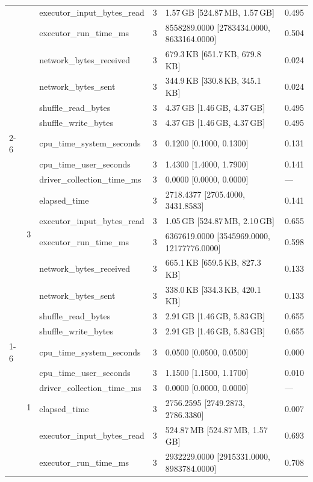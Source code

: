 \begin{tabular}{lllrll}
 &  & executor_input_bytes_read & 3 & 1.57\,GB [524.87\,MB, 1.57\,GB] & 0.495 \\
 &  & executor_run_time_ms & 3 & 8558289.0000 [2783434.0000, 8633164.0000] & 0.504 \\
 &  & network_bytes_received & 3 & 679.3\,KB [651.7\,KB, 679.8\,KB] & 0.024 \\
 &  & network_bytes_sent & 3 & 344.9\,KB [330.8\,KB, 345.1\,KB] & 0.024 \\
 &  & shuffle_read_bytes & 3 & 4.37\,GB [1.46\,GB, 4.37\,GB] & 0.495 \\
 &  & shuffle_write_bytes & 3 & 4.37\,GB [1.46\,GB, 4.37\,GB] & 0.495 \\
\cline{2-6}
 & \multirow[t]{10}{*}{3} & cpu_time_system_seconds & 3 & 0.1200 [0.1000, 0.1300] & 0.131 \\
 &  & cpu_time_user_seconds & 3 & 1.4300 [1.4000, 1.7900] & 0.141 \\
 &  & driver_collection_time_ms & 3 & 0.0000 [0.0000, 0.0000] & --- \\
 &  & elapsed_time & 3 & 2718.4377 [2705.4000, 3431.8583] & 0.141 \\
 &  & executor_input_bytes_read & 3 & 1.05\,GB [524.87\,MB, 2.10\,GB] & 0.655 \\
 &  & executor_run_time_ms & 3 & 6367619.0000 [3545969.0000, 12177776.0000] & 0.598 \\
 &  & network_bytes_received & 3 & 665.1\,KB [659.5\,KB, 827.3\,KB] & 0.133 \\
 &  & network_bytes_sent & 3 & 338.0\,KB [334.3\,KB, 420.1\,KB] & 0.133 \\
 &  & shuffle_read_bytes & 3 & 2.91\,GB [1.46\,GB, 5.83\,GB] & 0.655 \\
 &  & shuffle_write_bytes & 3 & 2.91\,GB [1.46\,GB, 5.83\,GB] & 0.655 \\
\cline{1-6} \cline{2-6}
\multirow[t]{30}{*}{national-scale-spatial-join-databricks-partitioned-8-nodes-small} & \multirow[t]{10}{*}{1} & cpu_time_system_seconds & 3 & 0.0500 [0.0500, 0.0500] & 0.000 \\
 &  & cpu_time_user_seconds & 3 & 1.1500 [1.1500, 1.1700] & 0.010 \\
 &  & driver_collection_time_ms & 3 & 0.0000 [0.0000, 0.0000] & --- \\
 &  & elapsed_time & 3 & 2756.2595 [2749.2873, 2786.3380] & 0.007 \\
 &  & executor_input_bytes_read & 3 & 524.87\,MB [524.87\,MB, 1.57\,GB] & 0.693 \\
 &  & executor_run_time_ms & 3 & 2932229.0000 [2915331.0000, 8983784.0000] & 0.708 \\

\end{tabular}
